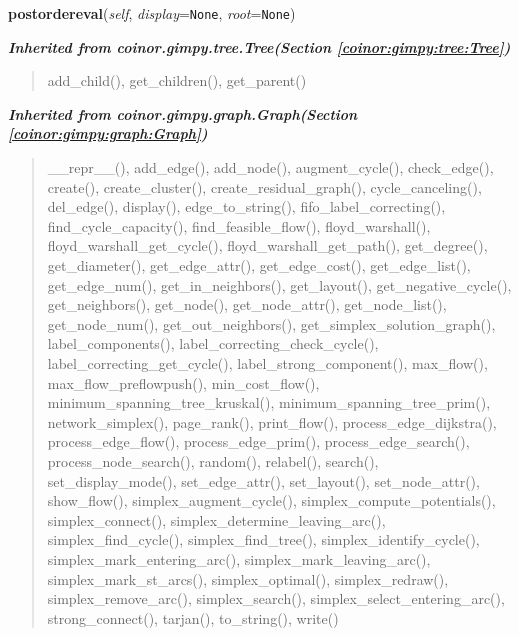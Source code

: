     \vspace{0.5ex}

\hspace{.8\funcindent}\begin{boxedminipage}{\funcwidth}

    \raggedright \textbf{postordereval}(\textit{self}, \textit{display}={\tt None}, \textit{root}={\tt None})

\setlength{\parskip}{2ex}
\setlength{\parskip}{1ex}
    \end{boxedminipage}


\large{\textbf{\textit{Inherited from coinor.gimpy.tree.Tree\textit{(Section \ref{coinor:gimpy:tree:Tree})}}}}

\begin{quote}
add\_child(), get\_children(), get\_parent()
\end{quote}

\large{\textbf{\textit{Inherited from coinor.gimpy.graph.Graph\textit{(Section \ref{coinor:gimpy:graph:Graph})}}}}

\begin{quote}
\_\_repr\_\_(), add\_edge(), add\_node(), augment\_cycle(), check\_edge(), create(), create\_cluster(), create\_residual\_graph(), cycle\_canceling(), del\_edge(), display(), edge\_to\_string(), fifo\_label\_correcting(), find\_cycle\_capacity(), find\_feasible\_flow(), floyd\_warshall(), floyd\_warshall\_get\_cycle(), floyd\_warshall\_get\_path(), get\_degree(), get\_diameter(), get\_edge\_attr(), get\_edge\_cost(), get\_edge\_list(), get\_edge\_num(), get\_in\_neighbors(), get\_layout(), get\_negative\_cycle(), get\_neighbors(), get\_node(), get\_node\_attr(), get\_node\_list(), get\_node\_num(), get\_out\_neighbors(), get\_simplex\_solution\_graph(), label\_components(), label\_correcting\_check\_cycle(), label\_correcting\_get\_cycle(), label\_strong\_component(), max\_flow(), max\_flow\_preflowpush(), min\_cost\_flow(), minimum\_spanning\_tree\_kruskal(), minimum\_spanning\_tree\_prim(), network\_simplex(), page\_rank(), print\_flow(), process\_edge\_dijkstra(), process\_edge\_flow(), process\_edge\_prim(), process\_edge\_search(), process\_node\_search(), random(), relabel(), search(), set\_display\_mode(), set\_edge\_attr(), set\_layout(), set\_node\_attr(), show\_flow(), simplex\_augment\_cycle(), simplex\_compute\_potentials(), simplex\_connect(), simplex\_determine\_leaving\_arc(), simplex\_find\_cycle(), simplex\_find\_tree(), simplex\_identify\_cycle(), simplex\_mark\_entering\_arc(), simplex\_mark\_leaving\_arc(), simplex\_mark\_st\_arcs(), simplex\_optimal(), simplex\_redraw(), simplex\_remove\_arc(), simplex\_search(), simplex\_select\_entering\_arc(), strong\_connect(), tarjan(), to\_string(), write()
\end{quote}


